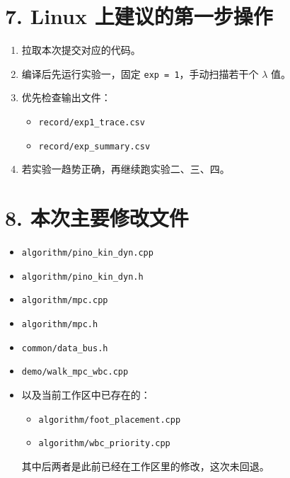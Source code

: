 \documentclass[11pt]{ctexart}
\begin{document}
\section*{7. Linux 上建议的第一步操作}
\begin{enumerate}
  \item 拉取本次提交对应的代码。
  \item 编译后先运行实验一，固定 \texttt{exp = 1}，手动扫描若干个 $\lambda$ 值。
  \item 优先检查输出文件：
  \begin{itemize}
    \item \texttt{record/exp1\_trace.csv}
    \item \texttt{record/exp\_summary.csv}
  \end{itemize}
  \item 若实验一趋势正确，再继续跑实验二、三、四。
\end{enumerate}

\section*{8. 本次主要修改文件}
\begin{itemize}
  \item \texttt{algorithm/pino\_kin\_dyn.cpp}
  \item \texttt{algorithm/pino\_kin\_dyn.h}
  \item \texttt{algorithm/mpc.cpp}
  \item \texttt{algorithm/mpc.h}
  \item \texttt{common/data\_bus.h}
  \item \texttt{demo/walk\_mpc\_wbc.cpp}
  \item 以及当前工作区中已存在的：
  \begin{itemize}
    \item \texttt{algorithm/foot\_placement.cpp}
    \item \texttt{algorithm/wbc\_priority.cpp}
  \end{itemize}
  其中后两者是此前已经在工作区里的修改，这次未回退。
\end{itemize}
\end{document}
